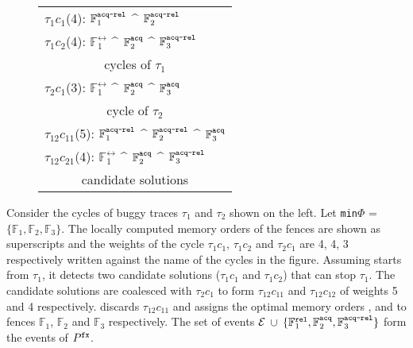 \begin{wrapfigure}{l}{0.45\textwidth}
	\vspace{-2.5em}
	\centering
	\setlength{\tabcolsep}{5pt}
	\begin{tabular}{|l|}
		\hline
		$\tau_1c_1$(4): $\mathbb{F}^\texttt{acq-rel}_1$ $\^$ $\mathbb{F}^\texttt{acq-rel}_2$ \\
		$\tau_1c_2$(4): $\mathbb{F}^\rel_1$ $\^$ $\mathbb{F}^\texttt{acq}_2$ $\^$ $\mathbb{F}^\texttt{acq-rel}_3$ \\
		\multicolumn{1}{|c|}{cycles of $\tau_1$} \\
		\hline
		
		$\tau_2c_1$(3): $\mathbb{F}^\rel_1$ $\^$ $\mathbb{F}^\texttt{acq}_2$ $\^$ $\mathbb{F}^\texttt{acq}_3$ \\
		\multicolumn{1}{|c|}{cycle of $\tau_2$} \\
		\hline
		
		$\tau_{12}c_{11}$(5): $\mathbb{F}^\texttt{acq-rel}_1$ $\^$ $\mathbb{F}^\texttt{acq-rel}_2$ $\^$ $\mathbb{F}^\texttt{acq}_3$ \\
		$\tau_{12}c_{21}$(4): $\mathbb{F}^\rel_1$ $\^$ $\mathbb{F}^\texttt{acq}_2$ $\^$ $\mathbb{F}^\texttt{acq-rel}_3$ \\
		\multicolumn{1}{|c|}{candidate solutions} \\
		\hline
	\end{tabular}
	\vspace{-2.5em}
\end{wrapfigure}

Consider the cycles of buggy traces $\tau_1$ and $\tau_2$
shown on the left.
Let {\tt min$\Phi$} = $\{\mathbb{F}_1, \mathbb{F}_2, 
\mathbb{F}_3\}$.
The locally computed memory orders of the fences are shown 
as superscripts and the weights of the cycle $\tau_1c_1$,
$\tau_1c_2$ and $\tau_2c_1$ are 4, 4, 3 respectively 
written against the name of the cycles in the figure.
%
Assuming \ourtechnique starts from $\tau_1$, it detects 
two candidate solutions ($\tau_1c_1$ and $\tau_1c_2$) that 
can stop $\tau_1$. 
%
The candidate solutions are coalesced with $\tau_2c_1$
to form $\tau_{12}c_{11}$ and $\tau_{12}c_{12}$ of
weights 5 and 4 respectively. \ourtechnique discards
$\tau_{12}c_{11}$ and assigns the optimal memory orders
\rel, \acq and \acqrel to fences $\mathbb{F}_1$,
$\mathbb{F}_2$ and $\mathbb{F}_3$ respectively.
%
The set of events $\mathcal{E}$ $\cup$ $\{\mathbb{F}^\texttt{rel}_1,
\mathbb{F}^\texttt{acq}_2, \mathbb{F}^\texttt{acq-rel}_3\}$ 
form the events of ${P}^{\mathtt{fx}}$.